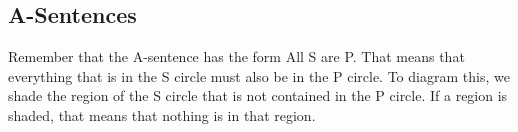 \documentclass[../logic-text.tex]{subfiles}
\begin{document}

\subsection{A-Sentences}

Remember that the A-sentence has the form All S are P. That means that everything that is in the S circle must also be in the P circle. To diagram this, we shade the region of the S circle that is not contained in the P circle. If a region is shaded, that means that nothing is in that region.
\end{document}
